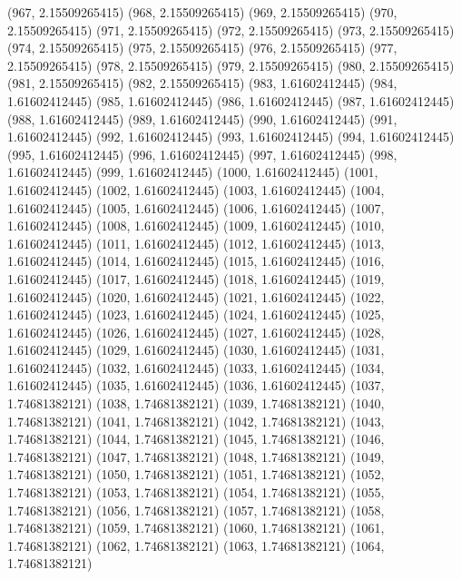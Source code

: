 {					(967, 2.15509265415)
					(968, 2.15509265415)
					(969, 2.15509265415)
					(970, 2.15509265415)
					(971, 2.15509265415)
					(972, 2.15509265415)
					(973, 2.15509265415)
					(974, 2.15509265415)
					(975, 2.15509265415)
					(976, 2.15509265415)
					(977, 2.15509265415)
					(978, 2.15509265415)
					(979, 2.15509265415)
					(980, 2.15509265415)
					(981, 2.15509265415)
					(982, 2.15509265415)
					(983, 1.61602412445)
					(984, 1.61602412445)
					(985, 1.61602412445)
					(986, 1.61602412445)
					(987, 1.61602412445)
					(988, 1.61602412445)
					(989, 1.61602412445)
					(990, 1.61602412445)
					(991, 1.61602412445)
					(992, 1.61602412445)
					(993, 1.61602412445)
					(994, 1.61602412445)
					(995, 1.61602412445)
					(996, 1.61602412445)
					(997, 1.61602412445)
					(998, 1.61602412445)
					(999, 1.61602412445)
					(1000, 1.61602412445)
					(1001, 1.61602412445)
					(1002, 1.61602412445)
					(1003, 1.61602412445)
					(1004, 1.61602412445)
					(1005, 1.61602412445)
					(1006, 1.61602412445)
					(1007, 1.61602412445)
					(1008, 1.61602412445)
					(1009, 1.61602412445)
					(1010, 1.61602412445)
					(1011, 1.61602412445)
					(1012, 1.61602412445)
					(1013, 1.61602412445)
					(1014, 1.61602412445)
					(1015, 1.61602412445)
					(1016, 1.61602412445)
					(1017, 1.61602412445)
					(1018, 1.61602412445)
					(1019, 1.61602412445)
					(1020, 1.61602412445)
					(1021, 1.61602412445)
					(1022, 1.61602412445)
					(1023, 1.61602412445)
					(1024, 1.61602412445)
					(1025, 1.61602412445)
					(1026, 1.61602412445)
					(1027, 1.61602412445)
					(1028, 1.61602412445)
					(1029, 1.61602412445)
					(1030, 1.61602412445)
					(1031, 1.61602412445)
					(1032, 1.61602412445)
					(1033, 1.61602412445)
					(1034, 1.61602412445)
					(1035, 1.61602412445)
					(1036, 1.61602412445)
					(1037, 1.74681382121)
					(1038, 1.74681382121)
					(1039, 1.74681382121)
					(1040, 1.74681382121)
					(1041, 1.74681382121)
					(1042, 1.74681382121)
					(1043, 1.74681382121)
					(1044, 1.74681382121)
					(1045, 1.74681382121)
					(1046, 1.74681382121)
					(1047, 1.74681382121)
					(1048, 1.74681382121)
					(1049, 1.74681382121)
					(1050, 1.74681382121)
					(1051, 1.74681382121)
					(1052, 1.74681382121)
					(1053, 1.74681382121)
					(1054, 1.74681382121)
					(1055, 1.74681382121)
					(1056, 1.74681382121)
					(1057, 1.74681382121)
					(1058, 1.74681382121)
					(1059, 1.74681382121)
					(1060, 1.74681382121)
					(1061, 1.74681382121)
					(1062, 1.74681382121)
					(1063, 1.74681382121)
					(1064, 1.74681382121)
}
